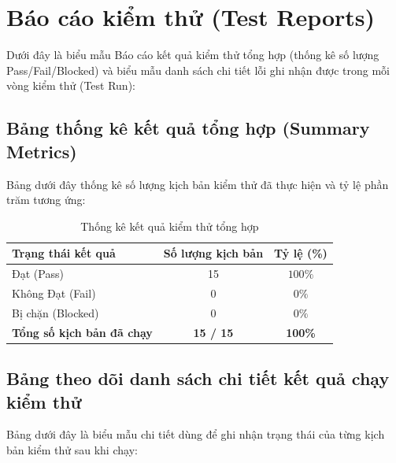 \section{Báo cáo kiểm thử (Test Reports)}
\label{sec:test_reports}

Dưới đây là biểu mẫu Báo cáo kết quả kiểm thử tổng hợp (thống kê số lượng Pass/Fail/Blocked) và biểu mẫu danh sách chi tiết lỗi ghi nhận được trong mỗi vòng kiểm thử (Test Run):

\subsection{Bảng thống kê kết quả tổng hợp (Summary Metrics)}

Bảng dưới đây thống kê số lượng kịch bản kiểm thử đã thực hiện và tỷ lệ phần trăm tương ứng:

\begin{table}[H]
\centering
\renewcommand{\arraystretch}{1.3}
\begin{tabularx}{0.8\textwidth}{|X|c|c|}
\hline
\rowcolor{tableheader}
\textbf{Trạng thái kết quả} & \textbf{Số lượng kịch bản} & \textbf{Tỷ lệ (\%)} \\ \hline
Đạt (Pass) & 15 & $100\%$ \\ \hline
Không Đạt (Fail) & 0 & $0\%$ \\ \hline
Bị chặn (Blocked) & 0 & $0\%$ \\ \hline
\rowcolor{lightgray}
\textbf{Tổng số kịch bản đã chạy} & \textbf{15 / 15} & \textbf{100\%} \\ \hline
\end{tabularx}
\caption{Thống kê kết quả kiểm thử tổng hợp}
\label{tab:test_summary}
\end{table}

\subsection{Bảng theo dõi danh sách chi tiết kết quả chạy kiểm thử}

Bảng dưới đây là biểu mẫu chi tiết dùng để ghi nhận trạng thái của từng kịch bản kiểm thử sau khi chạy:

